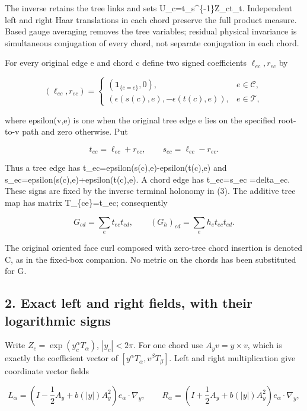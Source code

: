 \documentclass[
  11pt,
]{article}
\begin{document}
The inverse retains the tree links and sets U\_c=t\_s\^{}\{-1\}Z\_ct\_t.
Independent left and right Haar translations in each chord preserve the
full product measure. Based gauge averaging removes the tree variables;
residual physical invariance is simultaneous conjugation of every chord,
not separate conjugation in each chord.

For every original edge e and chord c define two signed coefficients
\(\ell_{ec},r_{ec}\) by

\[
 (\ell_{ec},r_{ec})=
 \begin{cases}
 (\mathbf1_{\{c=e\}},0),&e\in\mathcal C,\\
 (\epsilon(s(c),e),-\epsilon(t(c),e)),&e\in\mathcal T,
 \end{cases}                                                \tag{4}
\]

where epsilon(v,e) is one when the original tree edge e lies on the
specified root-to-v path and zero otherwise. Put

\[
 t_{ec}=\ell_{ec}+r_{ec},\qquad
 s_{ec}=\ell_{ec}-r_{ec}.                                  \tag{5}
\]

Thus a tree edge has t\_ec=epsilon(s(c),e)-epsilon(t(c),e) and
s\_ec=epsilon(s(c),e)+epsilon(t(c),e). A chord edge has t\_ec=s\_ec
=delta\_ec. These signs are fixed by the inverse terminal holonomy in
(3). The additive tree map has matrix T\_\{ce\}=t\_ec; consequently

\[
 G_{cd}=\sum_e t_{ec}t_{ed},\qquad
 (G_h)_{cd}=\sum_eh_e t_{ec}t_{ed}.                         \tag{6}
\]

The original oriented face curl composed with zero-tree chord insertion
is denoted C, as in the fixed-box companion. No metric on the chords has
been substituted for G.

\subsection{2. Exact left and right fields, with their logarithmic
signs}\label{weak-coupling-part-14-exact-left-and-right-fields-with-their-logarithmic-signs}

Write \(Z_c=\exp(y_c^\alpha T_\alpha)\), \(|y_c|<2\pi\). For one chord
use \(A_yv=y\times v\), which is exactly the coefficient vector of
\([y^\alpha T_\alpha,v^\beta T_\beta]\). Left and right multiplication
give coordinate vector fields

\[
 L_\alpha=\left(I-\frac12A_y+b(|y|)A_y^2\right)e_\alpha
                      \mathbin{\cdot}\nabla_y,
 \qquad
 R_\alpha=\left(I+\frac12A_y+b(|y|)A_y^2\right)e_\alpha
                      \mathbin{\cdot}\nabla_y,               \tag{7}
\]
\end{document}
